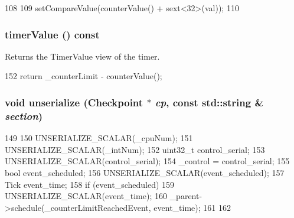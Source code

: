 \begin{DoxyCode}
108 {
109     setCompareValue(counterValue() + sext<32>(val));
110 }
\end{DoxyCode}
\hypertarget{classGenericTimer_1_1ArchTimer_a5bd6c4174ad5bdcd52b55f1da765218e}{
\subsubsection[{timerValue}]{ timerValue () const}}
\label{classGenericTimer_1_1ArchTimer_a5bd6c4174ad5bdcd52b55f1da765218e}


Returns the TimerValue view of the timer. 


\begin{DoxyCode}
152 { return _counterLimit - counterValue(); }
\end{DoxyCode}
\hypertarget{classGenericTimer_1_1ArchTimer_af22e5d6d660b97db37003ac61ac4ee49}{
\subsubsection[{unserialize}]{\setlength{\rightskip}{0pt plus 5cm}void unserialize ({\bf Checkpoint} $\ast$ {\em cp}, \/  const std::string \& {\em section})}}
\label{classGenericTimer_1_1ArchTimer_af22e5d6d660b97db37003ac61ac4ee49}



\begin{DoxyCode}
149 {
150     UNSERIALIZE_SCALAR(_cpuNum);
151     UNSERIALIZE_SCALAR(_intNum);
152     uint32_t control_serial;
153     UNSERIALIZE_SCALAR(control_serial);
154     _control = control_serial;
155     bool event_scheduled;
156     UNSERIALIZE_SCALAR(event_scheduled);
157     Tick event_time;
158     if (event_scheduled) {
159         UNSERIALIZE_SCALAR(event_time);
160         _parent->schedule(_counterLimitReachedEvent, event_time);
161     }
162 }
\end{DoxyCode}


